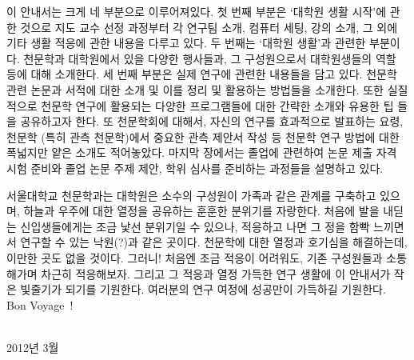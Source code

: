  이 안내서는 크게 네 부분으로 이루어져있다. 첫 번째 부분은 ‘대학원 생활 시작’에 관한 것으로 지도 교수 선정 과정부터 각 연구팀 소개, 컴퓨터 세팅, 강의 소개, 그 외에 기타 생활 적응에 관한 내용을 다루고 있다. 두 번째는 ‘대학원 생활’과 관련한 부분이다. 천문학과 대학원에서 있을 다양한 행사들과, 그 구성원으로서 대학원생들의 역할 등에 대해 소개한다. 세 번째 부분은 실제 연구에 관련한 내용들을 담고 있다. 천문학 관련 논문과 서적에 대한 소개 및 이를 정리 및 활용하는 방법들을 소개한다. 또한 실질적으로 천문학 연구에 활용되는 다양한 프로그램들에 대한 간략한 소개와 유용한 팁 들을 공유하고자 한다. 또 천문학회에 대해서, 자신의 연구를 효과적으로 발표하는 요령, 천문학 (특히 관측 천문학)에서 중요한 관측 제안서 작성 등 천문학 연구 방법에 대한 폭넓지만 얕은 소개도 적어놓았다. 마지막 장에서는 졸업에 관련하여 논문 제출 자격 시험 준비와 졸업 논문 주제 제안, 학위 심사를 준비하는 과정들을 설명하고 있다.

 서울대학교 천문학과는 대학원은 소수의 구성원이 가족과 같은 관계를 구축하고 있으며, 하늘과 우주에 대한 열정을 공유하는 훈훈한 분위기를 자랑한다. 처음에 발을 내딛는 신입생들에게는 조금 낯선 분위기일 수 있으나, 적응하고 나면 그 정을 함빡 느끼면서 연구할 수 있는 낙원(?)과 같은 곳이다. 천문학에 대한 열정과 호기심을 해결하는데, 이만한 곳도 없을 것이다. 그러니! 처음엔 조금 적응이 어려워도, 기존 구성원들과 소통해가며 차근히 적응해보자. 그리고 그 적응과 열정 가득한 연구 생활에 이 안내서가 작은 빛줄기가 되기를 기원한다. 여러분의 연구 여정에 성공만이 가득하길 기원한다. Bon Voyage~!

{ \\ 2012년 3월\par}


